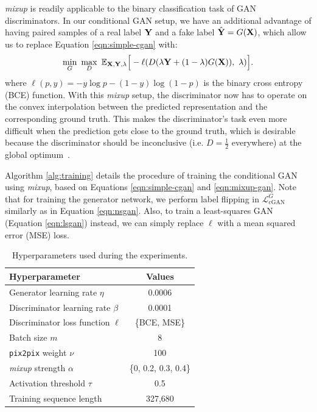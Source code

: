 \textit{mixup} is readily applicable to the binary classification task of GAN discriminators.
In our conditional GAN setup, we have an additional advantage of having paired samples of a real label $\mathbf{Y}$ and a fake label $\hat{\mathbf{Y}} = G(\mathbf{X})$, which allow us to replace Equation \ref{eqn:simple-cgan} with:
\begin{equation}\label{eqn:mixup-gan}
\min_{G} ~ \max_{D} ~ \mathbb{E}_{\mathbf{X},\mathbf{Y},\lambda} \Big [ - \ell (D(\lambda \mathbf{Y} + (1 - \lambda) G(\mathbf{X}) ), ~ \lambda) \Big ].
\end{equation}
where $\ell(p, y) = - y \log p - (1-y) \log (1-p)$ is the binary cross entropy (BCE) function.
With this \textit{mixup} setup, the discriminator now has to operate on the convex interpolation between the predicted representation and the corresponding ground truth.
This makes the discriminator's task even more difficult when the prediction gets close to the ground truth, which is desirable because the discriminator should be inconclusive (i.e. $D = \tfrac{1}{2}$ everywhere) at the global optimum~\cite{goodfellow2014gan}.

Algorithm \ref{alg:training} details the procedure of training the conditional GAN using \textit{mixup}, based on Equations \ref{eqn:simple-cgan} and \ref{eqn:mixup-gan}.
Note that for training the generator network, we perform label flipping in $\mathcal{L}_{\text{cGAN}}^G$ similarly as in Equation \ref{eqn:nsgan}.
Also, to train a least-squares GAN (Equation \ref{eqn:lsgan}) instead, we can simply replace $\ell$ with a mean squared error (MSE) loss.


\begin{table}[t]
	\small
	\renewcommand\arraystretch{1.2}
	\renewcommand{\tabcolsep}{5pt}
	\centering
	\begin{tabular}{l c} \toprule
		Hyperparameter & Values \\ \hline
		Generator learning rate $\eta$ & 0.0006 \\ 
		Discriminator learning rate $\beta$ & 0.0001 \\
		Discriminator loss function $\ell$ & \{BCE, MSE\}\\
		Batch size $m$ & 8 \\
		\texttt{pix2pix} weight $\nu$ & 100 \\
		\textit{mixup} strength $\alpha$ & \{0, 0.2, 0.3, 0.4\} \\
		Activation threshold $\tau$ & 0.5 \\
		Training sequence length & 327,680 \\
		\bottomrule
	\end{tabular}
	\vspace{1em}
	\caption{Hyperparameters used during the experiments.}\label{tab:hyperparameters}
\end{table}

